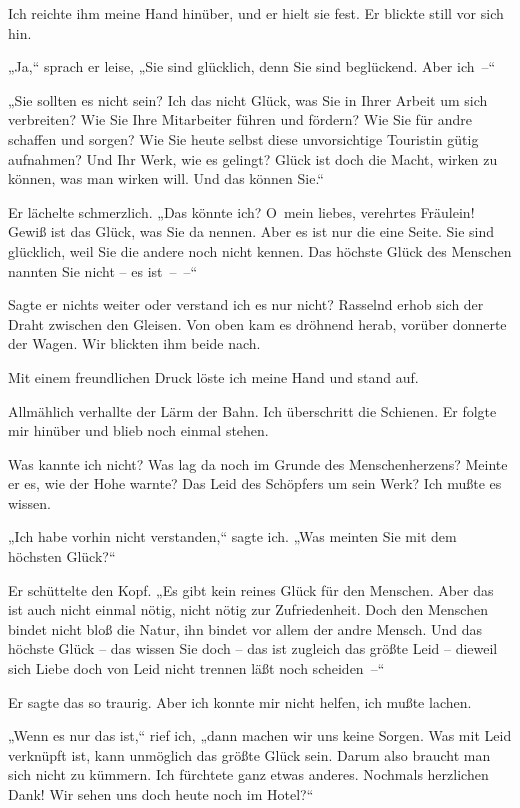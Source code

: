 Ich reichte ihm meine Hand hinüber, und er hielt sie fest. Er
blickte still vor sich hin.

„Ja,“ sprach er leise, „Sie sind glücklich, denn Sie sind
beglückend. Aber ich~–“

„Sie sollten es nicht sein? Ich das nicht Glück, was Sie in Ihrer
Arbeit um sich verbreiten? Wie Sie Ihre Mitarbeiter führen und
fördern? Wie Sie für andre schaffen und sorgen? Wie Sie heute
selbst diese unvorsichtige Touristin gütig aufnahmen? Und Ihr Werk,
wie es gelingt? Glück ist doch die Macht, wirken zu können, was man
wirken will. Und das können Sie.“

Er lächelte schmerzlich. „Das könnte ich? O~mein liebes, verehrtes
Fräulein! Gewiß ist das Glück, was Sie da nennen. Aber es ist nur
die eine Seite. Sie sind glücklich, weil Sie die andere noch nicht
kennen. Das höchste Glück des Menschen nannten Sie nicht – es
ist~–~–“

Sagte er nichts weiter oder verstand ich es nur nicht? Rasselnd
erhob sich der Draht zwischen den Gleisen. Von oben kam es dröhnend
herab, vorüber donnerte der Wagen. Wir blickten ihm beide nach.

Mit einem freundlichen Druck löste ich meine Hand und stand auf.

Allmählich verhallte der Lärm der Bahn. Ich überschritt die
Schienen. Er folgte mir hinüber und blieb noch einmal stehen.

Was kannte ich nicht? Was lag da noch im Grunde des
Menschenherzens? Meinte er es, wie der Hohe warnte? Das Leid des
Schöpfers um sein Werk? Ich mußte es wissen.

„Ich habe vorhin nicht verstanden,“ sagte ich. „Was meinten Sie mit
dem höchsten Glück?“

Er schüttelte den Kopf. „Es gibt kein reines Glück für den
Menschen. Aber das ist auch nicht einmal nötig, nicht nötig zur
Zufriedenheit. Doch den Menschen bindet nicht bloß die Natur, ihn
bindet vor allem der andre Mensch. Und das höchste Glück – das
wissen Sie doch – das ist zugleich das größte Leid – dieweil sich
Liebe doch von Leid nicht trennen läßt noch scheiden~–“

Er sagte das so traurig. Aber ich konnte mir nicht helfen, ich
mußte lachen.

„Wenn es nur das ist,“ rief ich, „dann machen wir uns keine Sorgen.
Was mit Leid verknüpft ist, kann unmöglich das größte Glück sein.
Darum also braucht man sich nicht zu kümmern. Ich fürchtete ganz
etwas anderes. Nochmals herzlichen Dank! Wir sehen uns doch heute
noch im Hotel?“


